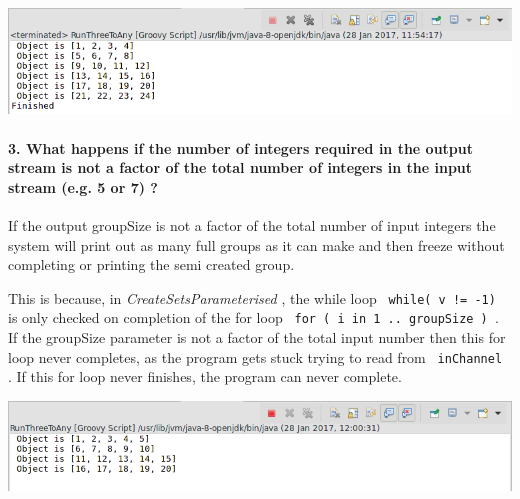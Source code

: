 

\includegraphics[width=\textwidth]{img/screenshots/2-2-q2.png}

\paragraph{3. What happens if the number of integers required in the output stream is not a factor of the total number of integers in the input stream (e.g. 5 or 7) ?}

If the output groupSize is not a factor of the total number of input integers the system will print out as many full groups as it can make and then freeze without completing or printing the semi created group.

This is because, in {\em CreateSetsParameterised }, the while loop \texttt{ while( v != -1) } is only checked on completion of the for loop \texttt{ for ( i in 1 .. groupSize ) }.  If the groupSize parameter is not a factor of the total input number then this for loop never completes, as the program gets stuck trying to read from \texttt{ inChannel }.  If this for loop never finishes, the program can never complete.

\includegraphics[width=\textwidth]{img/screenshots/2-2-q3.png}
